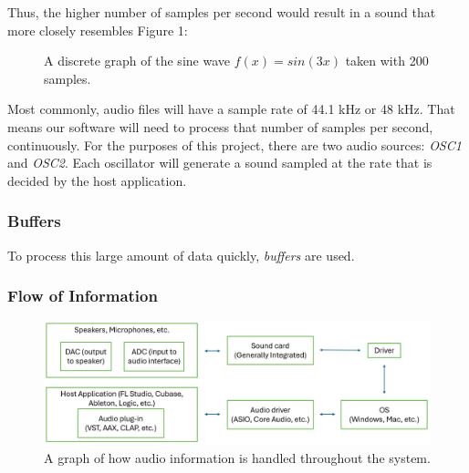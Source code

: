 \documentclass[12pt]{article}
\begin{document}
Thus, the higher number of samples per second would result in a sound that more closely resembles Figure 1:

\begin{figure}[h] %
	\begin{center}
		\caption{A discrete graph of the sine wave \(f(x) = sin(3x)\) taken with 200 samples.}
	\end{center}
\end{figure}


Most commonly, audio files will have a sample rate of 44.1 kHz or 48 kHz. That means our software will need to process that number of samples per second, continuously. For the purposes of this project, there are two audio sources: \textit{OSC1} and \textit{OSC2}. Each oscillator will generate a sound sampled at the rate that is decided by the host application.

\subsubsection{Buffers}
To process this large amount of data quickly, \textit{buffers} are used.

\subsubsection{Flow of Information}

\begin{center}
	\begin{figure}[h]
		\includegraphics[scale=0.4]{image1.png}
		\caption{A graph of how audio information is handled throughout the system.}
	\end{figure}
\end{center}
\end{document}
